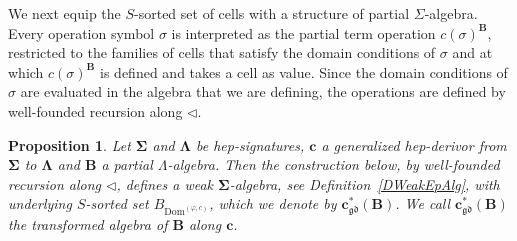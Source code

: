 \documentclass[a4paper, reqno]{amsbook}
\newcommand{\sig}[1]{\mathbf{#1}}             %
\newcommand{\Dom}{\mathrm{Dom}}
\newcommand{\gd}{\mathfrak{gd}}              %
\theoremstyle{plain}
\newtheorem{proposition}[theorem]{Proposition}
\theoremstyle{definition}
\begin{document}
We next equip the $S$-sorted set of cells with a structure of partial $\Sigma$-algebra.
Every operation symbol $\sigma$ is interpreted as the partial term operation $c(\sigma)^{\mathbf{B}}$, restricted to the families of cells that satisfy the domain conditions of $\sigma$ and at which $c(\sigma)^{\mathbf{B}}$ is defined and takes a cell as value.
Since the domain conditions of $\sigma$ are evaluated in the algebra that we are defining, the operations are defined by well-founded recursion along $\lhd$.

\begin{proposition}\label{PTransformedAlg}
Let $\sig{\Sigma}$ and $\sig{\Lambda}$ be hep-signatures, $\mathbf{c}$ a generalized hep-derivor from $\sig{\Sigma}$ to $\sig{\Lambda}$ and $\mathbf{B}$ a partial $\Lambda$-algebra.
Then the construction below, by well-founded recursion along $\lhd$, defines a weak $\sig{\Sigma}$-algebra, see Definition~\ref{DWeakEpAlg}, with underlying $S$-sorted set $B_{\Dom^{(\varphi,c)}}$, which we denote by $\mathbf{c}^{\ast}_{\gd}(\mathbf{B})$.
We call $\mathbf{c}^{\ast}_{\gd}(\mathbf{B})$ the \emph{transformed algebra} of $\mathbf{B}$ along $\mathbf{c}$.
\end{proposition}
\end{document}
